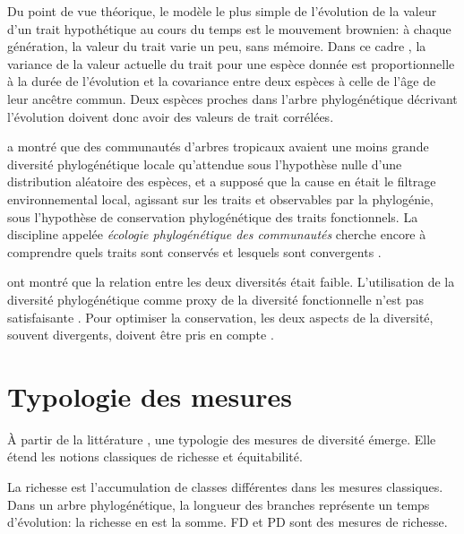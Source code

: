 \documentclass[
  11pt,
  french,
  a4paper,
  extrafontsizes,onecolumn,openright
  ]{memoir}
\begin{document}
Du point de vue théorique, le modèle le plus simple de l'évolution de la valeur d'un trait hypothétique au cours du temps est le mouvement brownien: à chaque génération, la valeur du trait varie un peu, sans mémoire.
Dans ce cadre \autocite{Felsenstein1985}, la variance de la valeur actuelle du trait pour une espèce donnée est proportionnelle à la durée de l'évolution et la covariance entre deux espèces à celle de l'âge de leur ancêtre commun.
Deux espèces proches dans l'arbre phylogénétique décrivant l'évolution doivent donc avoir des valeurs de trait corrélées.

\textcite{Webb2000} a montré que des communautés d'arbres tropicaux avaient une moins grande diversité phylogénétique locale qu'attendue sous l'hypothèse nulle d'une distribution aléatoire des espèces, et a supposé que la cause en était le filtrage environnemental local, agissant sur les traits et observables par la phylogénie, sous l'hypothèse de conservation phylogénétique des traits fonctionnels.
La discipline appelée \emph{écologie phylogénétique des communautés} cherche encore à comprendre quels traits sont conservés et lesquels sont convergents \autocite{Cavender-Bares2009}.

\textcite{Swenson2009} ont montré que la relation entre les deux diversités était faible.
L'utilisation de la diversité phylogénétique comme proxy de la diversité fonctionnelle n'est pas satisfaisante \autocite{Pavoine2011}. Pour optimiser la conservation, les deux aspects de la diversité, souvent divergents, doivent être pris en compte \autocite{Devictor2010}.

\hypertarget{typologie-des-mesures}{%
\section{Typologie des mesures}\label{typologie-des-mesures}}

À partir de la littérature \autocite{Ricotta2007,Pavoine2011}, une typologie des mesures de diversité émerge.
Elle étend les notions classiques de richesse et équitabilité.

La richesse est l'accumulation de classes différentes dans les mesures classiques.
Dans un arbre phylogénétique, la longueur des branches représente un temps d'évolution: la richesse en est la somme.
FD et PD sont des mesures de richesse.



\scriptsize
\end{document}
